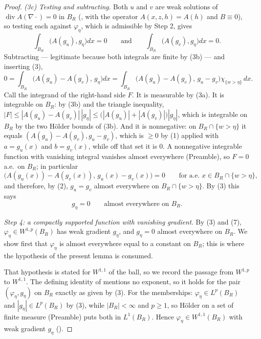 \begin{proof}
\emph{(3c) Testing and subtracting.}  Both $u$ and $v$ are weak solutions of
$\operatorname{div}A(\nabla\cdot)=0$ in $B_R$ (, with
the operator $A(x,z,h)=A(h)$ and $B\equiv0$), so testing each against
$\varphi_\eta$, which is admissible by Step 2, gives
\[
\int_{B_R}\bigl(A(g_u),g_\eta\bigr)dx=0
\qquad\text{and}\qquad
\int_{B_R}\bigl(A(g_v),g_\eta\bigr)dx=0 .
\]
Subtracting --- legitimate because both integrals are finite by (3b) --- and
inserting (3),
\[
0=\int_{B_R}\bigl(A(g_u)-A(g_v),\,g_\eta\bigr)dx
=\int_{B_R}\bigl(A(g_u)-A(g_v),\,g_u-g_v\bigr)\chi_{\{w>\eta\}}\,dx .
\tag{6}
\]
Call the integrand of the right-hand side $F$.  It is measurable by (3a).  It is
integrable on $B_R$: by (3b) and the triangle inequality,
$|F|\le|A(g_u)-A(g_v)|\,|g_\eta|\le\bigl(|A(g_u)|+|A(g_v)|\bigr)|g_\eta|$, which
is integrable on $B_R$ by the two H\"older bounds of (3b).  And it is
nonnegative: on $B_R\cap\{w>\eta\}$ it equals
$(A(g_u)-A(g_v),g_u-g_v)$, which is $\ge0$ by (1) applied with $a=g_u(x)$ and
$b=g_v(x)$, while off that set it is $0$.  A nonnegative integrable function
with vanishing integral vanishes almost everywhere (Preamble), so $F=0$ a.e.\ on
$B_R$; in particular
\[
\bigl(A(g_u(x))-A(g_v(x)),\,g_u(x)-g_v(x)\bigr)=0
\qquad\text{for a.e.\ }x\in B_R\cap\{w>\eta\} ,
\]
and therefore, by (2), $g_u=g_v$ almost everywhere on $B_R\cap\{w>\eta\}$.  By
(3) this says
\[
g_\eta=0\qquad\text{almost everywhere on }B_R .
\tag{7}
\]

\emph{Step 4: a compactly supported function with vanishing gradient.}  By (3)
and (7), $\varphi_\eta\in W^{1,p}(B_R)$ has weak gradient $g_\eta$, and
$g_\eta=0$ almost everywhere on $B_R$.  We show first that $\varphi_\eta$ is
almost everywhere equal to a constant on $B_R$; this is where the hypothesis
 of the present lemma is consumed.

That hypothesis is stated for $W^{1,1}$ of the ball, so we record the passage
from $W^{1,p}$ to $W^{1,1}$.  The defining identity of
 mentions no exponent, so it holds for the pair
$(\varphi_\eta,g_\eta)$ on $B_R$ exactly as given by (3).  For the memberships:
$\varphi_\eta\in L^p(B_R)$ and $|g_\eta|\in L^p(B_R)$ by (3), while
$|B_R|<\infty$ and $p\ge1$, so H\"older on a set of finite measure (Preamble)
puts both in $L^1(B_R)$.  Hence $\varphi_\eta\in W^{1,1}(B_R)$ with weak
gradient $g_\eta$ ().


\end{proof}
